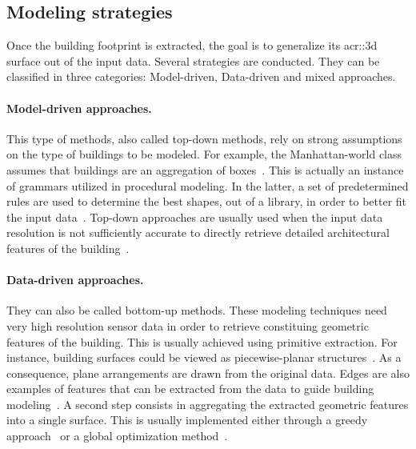     \subsection{Modeling strategies}
        \label{subsec::state_of_the_art::building_modeling::modeling_strategies}
        Once the building footprint is extracted, the goal is to generalize its \gls{acr::3d} surface out of the input data.
        Several strategies are conducted.
        They can be classified in three categories: Model-driven, Data-driven and mixed approaches.\\

        \paragraph{Model-driven approaches.}
            This type of methods, also called top-down methods, rely on strong assumptions on the type of buildings to be modeled.
            For example, the Manhattan-world class assumes that buildings are an aggregation of boxes~\parencite{vanegas2010building,ledoux2011topologically,arroyo2015dimension,li2016manhattan}.
            This is actually an instance of grammars utilized in procedural modeling.
            In the latter, a set of predetermined rules are used to determine the best shapes, out of a library, in order to better fit the input data~\parencite{lafarge2008structural,koutsourakis2009single,zhou20102,simon2011random,mathias2011procedural,martinovic2013bayesian,nan2015template,demir2015procedural,zeng2018neural}.
            Top-down approaches are usually used when the input data resolution is not sufficiently accurate to directly retrieve detailed architectural features of the building~\parencite{lafarge2008structural}.

        \paragraph{Data-driven approaches.}
            They can also be called bottom-up methods.
            These modeling techniques need very high resolution sensor data in order to retrieve constituing geometric features of the building.
            This is usually achieved using primitive extraction.
            For instance, building surfaces could be viewed as piecewise-planar structures~\parencite{taillandier2004automatic,chauve2010robust,lafarge2012creating,nan2017polyfit}.
            As a consequence, plane arrangements are drawn from the original data.
            Edges are also examples of features that can be extracted from the data to guide building modeling~\parencite{baillard1999automatic}.
            A second step consists in aggregating the extracted geometric features into a single surface.
            This is usually implemented either through a greedy approach~\parencite{taillandier2004automatic} or a global optimization method~\parencite{poullis2013framework,verdie2015lod,zhu2018large,holzmann2018semantically}.


